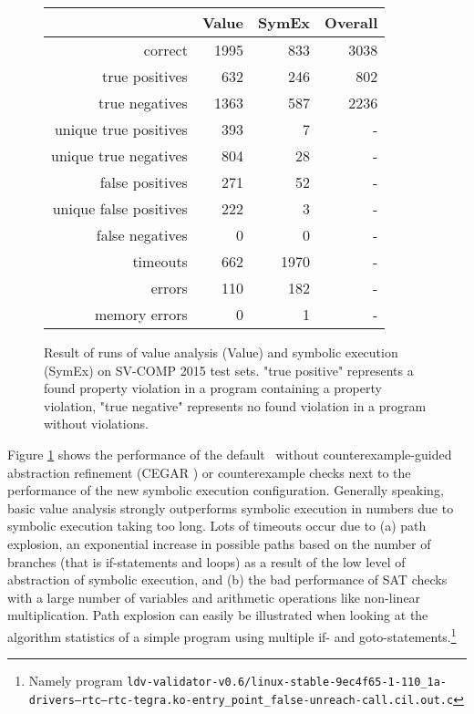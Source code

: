 \begin{figure}
\begin{tabular}{| r || r | r | r |}
\hline
                     & Value & SymEx & Overall \\ \hline
correct                & 1995 &  833 & 3038 \\ \hline
true positives         &  632 &  246 &  802 \\ \hline
true negatives         & 1363 &  587 & 2236 \\ \hline
unique true positives  &  393 &    7 &    - \\ \hline
unique true negatives  &  804 &   28 &    - \\ \hline
false positives        &  271 &   52 &    - \\ \hline
unique false positives &  222 &    3 &    - \\ \hline
false negatives        &    0 &    0 &    - \\ \hline 
timeouts               &  662 & 1970 &    - \\ \hline
errors                 &  110 &  182 &    - \\ \hline
memory errors          &    0 &    1 &    - \\ \hline
\end{tabular}
\caption{Result of runs of value analysis (Value) and symbolic execution (SymEx) on SV-COMP 2015 test sets.
  "true positive" represents a found property violation in a program containing a property violation,
  "true negative" represents no found violation in a program without violations.}
\label{tab:diff}
\end{figure}
Figure \ref{tab:diff} shows the performance of the default \ without counterexample-guided abstraction refinement (CEGAR \cite{Beyer2013}) or counterexample checks next to the performance of the new symbolic execution configuration.
Generally speaking, basic value analysis strongly outperforms symbolic execution in numbers due to symbolic execution taking too long.
Lots of timeouts occur due to
(a) path explosion, an exponential increase in possible paths based on the number of branches (that is if-statements and loops) as a result of the low level of abstraction of symbolic execution, and
(b) the bad performance of SAT checks with a large number of variables and arithmetic operations like non-linear multiplication.
Path explosion can easily be illustrated when looking at the algorithm statistics of a simple program using multiple if- and goto-statements.\footnote{Namely program \texttt{ldv-validator-v0.6/linux-stable-9ec4f65-1-110\_1a-drivers--rtc--rtc-tegra.ko-entry\_point\_false-unreach-call.cil.out.c}}
